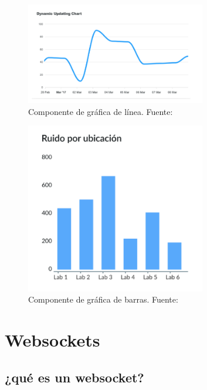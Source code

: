 {{\begin{itemize}
            \begin{figure}[H]
             \centering
              \includegraphics[width=0.7\textwidth]{../img/grafico_linea.png}
              \caption{Componente de gráfica de línea. Fuente: \parencite{carpio2025}}
              \label{fig:your_label}
            \end{figure} 

            \begin{figure}[H]
              \centering
              \includegraphics[width=0.7\textwidth]{../img/grafico_barras.png}
              \caption{Componente de gráfica de barras. Fuente: \cite{carpio2025}}
              \label{fig:your_label}
            \end{figure}
    
\end{itemize}

\section{Websockets}

\subsection{¿qué es un websocket?}

}}
